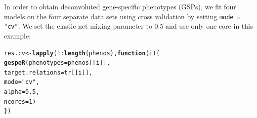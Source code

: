 \documentclass{article}\usepackage[]{graphicx}\usepackage[]{color}
\makeatletter
\newcommand{\hlnum}[1]{\textcolor[rgb]{0.686,0.059,0.569}{#1}}%
\newcommand{\hlstr}[1]{\textcolor[rgb]{0.192,0.494,0.8}{#1}}%
\newcommand{\hlopt}[1]{\textcolor[rgb]{0,0,0}{#1}}%
\newcommand{\hlstd}[1]{\textcolor[rgb]{0.345,0.345,0.345}{#1}}%
\newcommand{\hlkwa}[1]{\textcolor[rgb]{0.161,0.373,0.58}{\textbf{#1}}}%
\newcommand{\hlkwb}[1]{\textcolor[rgb]{0.69,0.353,0.396}{#1}}%
\newcommand{\hlkwc}[1]{\textcolor[rgb]{0.333,0.667,0.333}{#1}}%
\newcommand{\hlkwd}[1]{\textcolor[rgb]{0.737,0.353,0.396}{\textbf{#1}}}%
\newenvironment{kframe}{%
 \def\at@end@of@kframe{}%
 \ifinner\ifhmode%
  \def\at@end@of@kframe{\end{minipage}}%
  \begin{minipage}{\columnwidth}%
 \fi\fi%
 \def\FrameCommand##1{\hskip\@totalleftmargin \hskip-\fboxsep
 \colorbox{shadecolor}{##1}\hskip-\fboxsep
     \hskip-\linewidth \hskip-\@totalleftmargin \hskip\columnwidth}%
 \MakeFramed {\advance\hsize-\width
   \@totalleftmargin\z@ \linewidth\hsize
   \@setminipage}}%
 {\par\unskip\endMakeFramed%
 \at@end@of@kframe}
\newenvironment{knitrout}{}{} %
\makeatother
\begin{document}
In order to obtain deconvoluted gene-specific phenotypes (GSPs), we fit four models on the four separate data sets using cross validation by setting \texttt{mode = "cv"}. We set the elastic net mixing parameter to 0.5 and use only one core in this example:
\begin{knitrout}
\color{fgcolor}\begin{kframe}
\begin{alltt}
  \hlstd{res.cv} \hlkwb{<-} \hlkwd{lapply}\hlstd{(}\hlnum{1}\hlopt{:}\hlkwd{length}\hlstd{(phenos),} \hlkwa{function}\hlstd{(}\hlkwc{i}\hlstd{) \{}
    \hlkwd{gespeR}\hlstd{(}\hlkwc{phenotypes} \hlstd{= phenos[[i]],}
          \hlkwc{target.relations} \hlstd{= tr[[i]],}
           \hlkwc{mode} \hlstd{=} \hlstr{"cv"}\hlstd{,}
           \hlkwc{alpha} \hlstd{=} \hlnum{0.5}\hlstd{,}
           \hlkwc{ncores} \hlstd{=} \hlnum{1}\hlstd{)}
  \hlstd{\})}
\end{alltt}
\end{kframe}
\end{knitrout}
\end{document}
